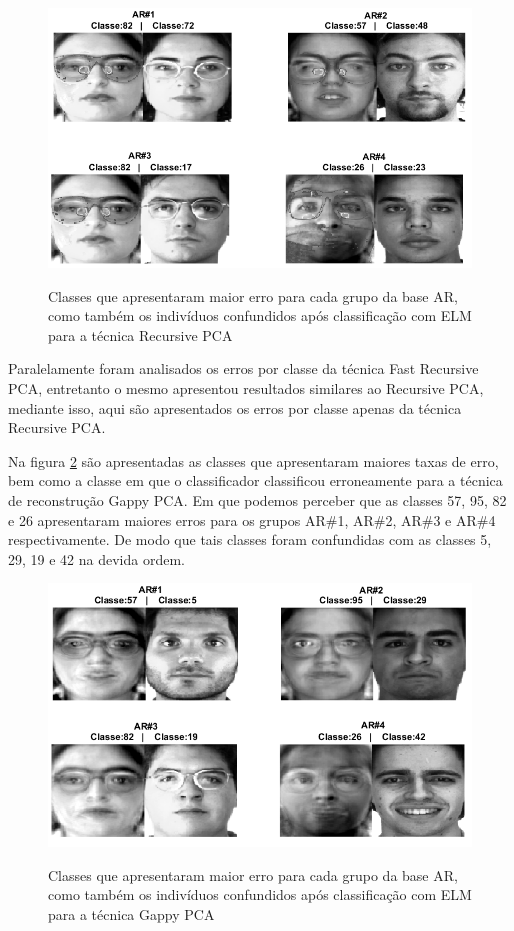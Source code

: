 \begin{figure}[H]
\centering
\caption{Classes que apresentaram maior erro para cada grupo da base AR, como também os indivíduos confundidos após classificação com ELM para a técnica Recursive PCA}
\includegraphics[scale=0.55]{imgs4/classes_erradas_FastRecPCA}
\label{fig:classes_erradas_FastRecPCA}
\end{figure}

Paralelamente foram analisados os erros por classe da técnica Fast Recursive PCA, entretanto o mesmo apresentou resultados similares ao Recursive PCA, mediante isso, aqui são apresentados os erros por classe apenas da técnica Recursive PCA. 

Na figura \ref{fig:classes_erradas_GPCA} são apresentadas as classes que apresentaram maiores taxas de erro, bem como a classe em que o classificador classificou erroneamente para a técnica de reconstrução Gappy PCA. Em que podemos perceber que as classes 57, 95, 82 e 26 apresentaram maiores erros para os grupos AR\#1, AR\#2, AR\#3 e AR\#4 respectivamente. De modo que tais classes foram confundidas com as classes 5, 29, 19 e 42 na devida ordem.


\begin{figure}[H]
\centering
\caption{Classes que apresentaram maior erro para cada grupo da base AR, como também os indivíduos confundidos após classificação com ELM para a técnica Gappy PCA}
\includegraphics[scale=0.55]{imgs4/classes_erradas_GPCA}
\label{fig:classes_erradas_GPCA}
\end{figure}

